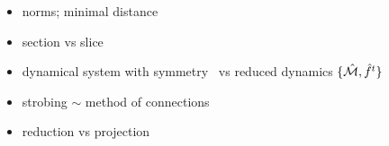     \ifdraft\color{blue}
\begin{itemize}

  \item
        norms; minimal distance
  \item section {\PoincS} vs slice \pSRed

  \item
dynamical system  with symmetry \Group\ vs reduced dynamics
$\{\hat{\cal M},\hat{f}^t\}$
  \item strobing $\sim$ method of connections
  \item reduction vs projection
\end{itemize}
    \color{black}\fi
